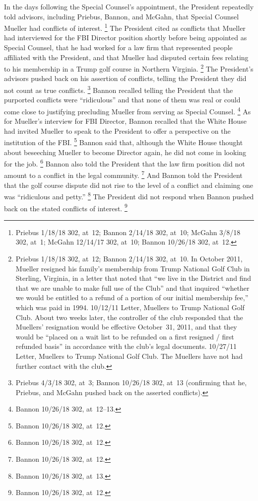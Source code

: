 In the days following the Special Counsel's appointment, the President repeatedly told advisors, including Priebus, Bannon, and McGahn, that Special Counsel Mueller had conflicts of interest.%
\footnote{Priebus 1/18/18 302, at~12;
Bannon 2/14/18 302, at~10;
McGahn 3/8/18 302, at~1;
McGahn 12/14/17 302, at~10;
Bannon 10/26/18 302, at~12.}
The President cited as conflicts that Mueller had interviewed for the FBI Director position shortly before being appointed as Special Counsel, that he had worked for a law firm that represented people affiliated with the President, and that Mueller had disputed certain fees relating to his membership in a Trump golf course in Northern Virginia.%
\footnote{Priebus 1/18/18 302, at~12;
Bannon 2/14/18 302, at~10.
In October 2011, Mueller resigned his family's membership from Trump National Golf Club in Sterling, Virginia, in a letter that noted that ``we live in the District and find that we are unable to make full use of the Club'' and that inquired ``whether we would be entitled to a refund of a portion of our initial membership fee,'' which was paid in 1994.
10/12/11 Letter, Muellers to Trump National Golf Club.
About two weeks later, the controller of the club responded that the Muellers' resignation would be effective October~31, 2011, and that they would be ``placed on a wait list to be refunded on a first resigned / first refunded basis'' in accordance with the club's legal documents.
10/27/11 Letter, Muellers to Trump National Golf Club.
The Muellers have not had further contact with the club.}
The President's advisors pushed back on his assertion of conflicts, telling the President they did not count as true conflicts.%
\footnote{Priebus 4/3/18 302, at~3;
Bannon 10/26/18 302, at~13 (confirming that he, Priebus, and McGahn pushed back on the asserted conflicts).}
Bannon recalled telling the President that the purported conflicts were ``ridiculous'' and that none of them was real or could come close to justifying precluding Mueller from serving as Special Counsel.%
\footnote{Bannon 10/26/18 302, at~12--13.}
As for Mueller's interview for FBI Director, Bannon recalled that the White House had invited Mueller to speak to the President to offer a perspective on the institution of the FBI\null.%
\footnote{Bannon 10/26/18 302, at~12.}
Bannon said that, although the White House thought about beseeching Mueller to become Director again, he did not come in looking for the job.%
\footnote{Bannon 10/26/18 302, at~12.}
Bannon also told the President that the law firm position did not amount to a conflict in the legal community.%
\footnote{Bannon 10/26/18 302, at~12.}
And Bannon told the President that the golf course dispute did not rise to the level of a conflict and claiming one was ``ridiculous and petty.''%
\footnote{Bannon 10/26/18 302, at~13.}
The President did not respond when Bannon pushed back on the stated conflicts of interest.%
\footnote{Bannon 10/26/18 302, at~12.}

